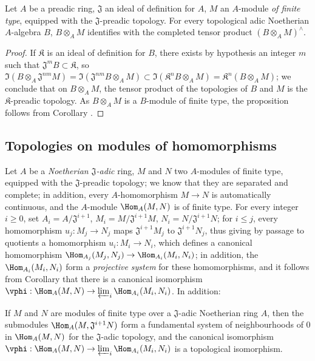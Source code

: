 \begin{proposition}[7.7.8]
\label{0.7.7.8}
Let $A$ be a preadic ring, $\mathfrak{J}$ an ideal of definition for $A$, $M$ an $A$-module
\emph{of finite type}, equipped with the $\mathfrak{J}$-preadic topology. For every topological
adic Noetherian $A$-algebra $B$, $B\otimes_A M$ identifies with the completed tensor product
$(B\otimes_A M)^\wedge$.
\end{proposition}

\begin{proof}
If $\mathfrak{K}$ is an ideal of definition for $B$, there exists by hypothesis an integer $m$ such that $\mathfrak{J}^m B\subset\mathfrak{K}$, so $\Im(B\otimes_A\mathfrak{J}^{nm}M)=\Im(\mathfrak{J}^{nm}B\otimes_A M)\subset\Im(\mathfrak{K}^n B\otimes_A M)=\mathfrak{K}^n(B\otimes_A M)$;
we conclude that on $B\otimes_A M$, the tensor product of the topologies of $B$ and $M$ is the $\mathfrak{K}$-preadic topology.
As $B\otimes_A M$ is a $B$-module of finite type, the proposition follows from Corollary .
\end{proof}

\subsection{Topologies on modules of homomorphisms}
\label{subsection:0.7.8}

\begin{env}[7.8.1]
\label{0.7.8.1}
Let $A$ be a \emph{Noetherian $\mathfrak{J}$-adic} ring, $M$ and $N$ two $A$-modules of finite type,
equipped with the $\mathfrak{J}$-preadic topology; we know  that they are
separated and complete; in addition, every $A$-homomorphism $M\to N$ is automatically continuous, and
the $A$-module $\Hom_A(M,N)$ is of finite type. For every integer $i\geq 0$, set
$A_i=A/\mathfrak{J}^{i+1}$, $M_i=M/\mathfrak{J}^{i+1}M$, $N_i=N/\mathfrak{J}^{i+1}N$; for
$i\leq j$, every homomorphism $u_j:M_j\to N_j$ maps $\mathfrak{J}^{i+1}M_j$ to
$\mathfrak{J}^{i+1}N_j$, thus giving by passage to quotients a homomorphism $u_i:M_i\to N_i$, which
defines a canonical homomorphism $\Hom_{A_j}(M_j,N_j)\to\Hom_{A_i}(M_i,N_i)$; in addition, the
$\Hom_{A_i}(M_i,N_i)$ form a \emph{projective system} for these homomorphisms, and it follows from
Corollary  that there is a canonical isomorphism
$\vphi:\Hom_A(M,N)\to\varprojlim_i\Hom_{A_i}(M_i,N_i)$.
In addition:
\end{env}

\begin{proposition}[7.8.2]
\label{0.7.8.2}
If $M$ and $N$ are modules of finite type over a $\mathfrak{J}$-adic Noetherian ring $A$, then the
submodules $\Hom_A(M,\mathfrak{J}^{i+1}N)$ form a fundamental system of neighbourhoods of $0$ in
$\Hom_A(M,N)$ for the $\mathfrak{J}$-adic topology, and the canonical isomorphism
$\vphi:\Hom_A(M,N)\to\varprojlim_i\Hom_{A_i}(M_i,N_i)$ is a topological isomorphism.
\end{proposition}

